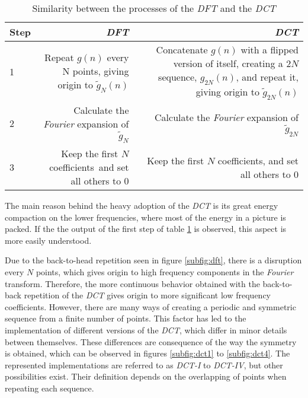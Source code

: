 \begin{table}[h]
    \centering
    \begin{tabular}{l|r|r|r|r} 
        \textbf{Step} &      \multicolumn{2}{r|}{\textbf{\emph{DFT}}} &      \multicolumn{2}{r}{\textbf{\emph{DCT}}} \\ \hline
        1 &         \multicolumn{2}{p{0.4\textwidth}|}{Repeat $g(n)$ every N points, giving origin to $\widetilde{g}_N(n)$} &         \multicolumn{2}{p{0.4\textwidth}}{Concatenate $g(n)$ with a flipped version of itself, creating a $2N$ sequence, $g_{2N}(n)$, and repeat it, giving origin to $\widetilde{g}_{2N}(n)$}\\ \hline
        2 &         \multicolumn{2}{p{0.4\textwidth}|}{Calculate the \emph{Fourier} expansion of $\widetilde{g}_N$} &         \multicolumn{2}{p{0.4\textwidth}}{Calculate the \emph{Fourier} expansion of $\widetilde{g}_{2N}$}\\ \hline
        3 &         \multicolumn{2}{p{0.4\textwidth}|}{Keep the first $N$ coefficients\, and set all others to $0$} &         \multicolumn{2}{p{0.4\textwidth}}{Keep the first $N$ coefficients, and set all others to $0$}\\ 
    \end{tabular}
    \caption{Similarity between the processes of the        \emph{DFT} and the \emph{DCT}}
    \label{tab:DFTDCT}
\end{table}

The main reason behind the heavy adoption of the \emph{DCT} is its great energy compaction on the lower frequencies, where most of the energy in a picture is packed. If the the output of the first step of table \ref{tab:DFTDCT} is observed, this aspect is more easily understood.

Due to the back-to-head repetition seen in figure \ref{subfig:dft}, there is a disruption every $N$ points, which gives origin to high frequency components in the \emph{Fourier} transform. Therefore, the more continuous behavior obtained with the back-to-back repetition of the \emph{DCT} gives origin to more significant low frequency coefficients. However, there are many ways of creating a periodic and symmetric sequence from a finite number of points. This factor has led to the implementation of different versions of the \emph{DCT}, which differ in minor details between themselves. These differences are consequence of the way the symmetry is obtained, which can be observed in figures \ref{subfig:dct1} to \ref{subfig:dct4}. The represented implementations are referred to as \emph{DCT-I} to \emph{DCT-IV}, but other possibilities exist. Their definition depends on the overlapping of points when repeating each sequence.


